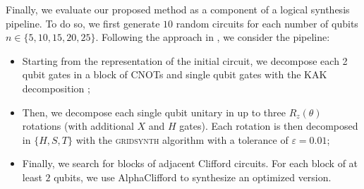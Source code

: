 \documentclass[conference]{IEEEtran}
\begin{document}
Finally, we evaluate our proposed method as a component of a logical synthesis pipeline. To do so, we first generate $10$ random circuits for each number of qubits $n\in\{5, 10, 15, 20, 25\}$. Following the approach in \cite{qpresyn}, we consider the pipeline:
\begin{itemize}
    \item Starting from the representation of the initial circuit, we decompose each 2 qubit gates in a block of CNOTs and single qubit gates with the KAK decomposition \cite{cartan_sur_1926};
    \item Then, we decompose each single qubit unitary in up to three $R_z(\theta)$ rotations (with additional $X$ and $H$ gates). Each rotation is then decomposed in $\{H, S, T\}$ with the \textsc{gridsynth} algorithm \cite{ross2016optimalancillafreeClifford} with a tolerance of $\varepsilon=0.01$; 
    \item Finally, we search for blocks of adjacent Clifford circuits. For each block of at least $2$ qubits, we use AlphaClifford to synthesize an optimized version.
\end{itemize}
\end{document}
